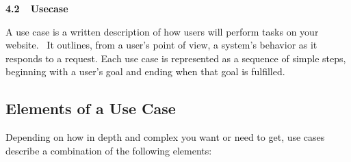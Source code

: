 \documentclass[12pt]{report}
\renewcommand{\_}{\kern-1.5pt\textunderscore\kern-1.5pt}
\begin{document}
\vspace{\baselineskip}

\vspace{\baselineskip}

\vspace{\baselineskip}

\vspace{\baselineskip}

\vspace{\baselineskip}
\begin{adjustwidth}{0.2in}{0.84in}
\begin{justify}
{\fontsize{14pt}{16.8pt}\selectfont \textbf{\textcolor[HTML]{0D0D0D}{4.2\ \  Usecase}}\par}
\end{justify}\par

\end{adjustwidth}

\begin{adjustwidth}{0.2in}{0.84in}
\begin{justify}
\textcolor[HTML]{0D0D0D}{A use case is a written description of how users will perform tasks on your website.  It outlines, from a user’s point of view, a system’s behavior as it responds to a request. Each use case is represented as a sequence of simple steps, beginning with a user's goal and ending when that goal is fulfilled.}
\end{justify}\par

\end{adjustwidth}


\vspace{\baselineskip}
\begin{adjustwidth}{0.2in}{0.84in}
\subsection*{Elements of a Use Case}
\end{adjustwidth}

\setlength{\parskip}{9.6pt}
\begin{adjustwidth}{0.2in}{0.84in}
\textcolor[HTML]{0D0D0D}{Depending on how in depth and complex you want or need to get, use cases describe a combination of the following elements:}\par

\end{adjustwidth}
\end{document}
